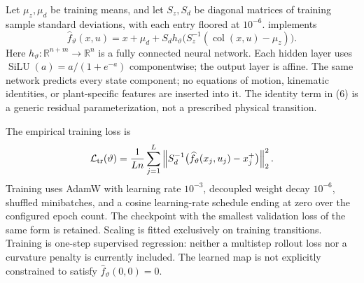 \documentclass[11pt]{article}
\newcommand{\col}{\operatorname{col}}
\newcommand{\code}[1]{\texttt{\detokenize{#1}}}
\begin{document}
Let $\mu_z,\mu_d$ be training means, and let $S_z,S_d$ be diagonal matrices of training sample standard deviations, with each entry floored at $10^{-6}$. \code{DataDrivenTransition} implements
\begin{equation}\label{eq:transition}
\widehat f_\vartheta(x,u)=x+\mu_d+S_d h_\vartheta\bigl(S_z^{-1}(\col(x,u)-\mu_z)\bigr).
\end{equation}
Here $h_\vartheta:\mathbb R^{n+m}\to\mathbb R^n$ is a fully connected neural network. Each hidden layer uses $\operatorname{SiLU}(a)=a/(1+e^{-a})$ componentwise; the output layer is affine. The same network predicts every state component; no equations of motion, kinematic identities, or plant-specific features are inserted into it. The identity term in (6) is a generic residual parameterization, not a prescribed physical transition.

The empirical training loss is
\begin{equation}\label{eq:loss}
\mathcal L_{\rm tr}(\vartheta)=\frac1{Ln}\sum_{j=1}^L\left\|S_d^{-1}\bigl(\widehat f_\vartheta(x_j,u_j)-x_j^+\bigr)\right\|_2^2.
\end{equation}
Training uses AdamW with learning rate $10^{-3}$, decoupled weight decay $10^{-6}$, shuffled minibatches, and a cosine learning-rate schedule ending at zero over the configured epoch count. The checkpoint with the smallest validation loss of the same form is retained. Scaling is fitted exclusively on training transitions. Training is one-step supervised regression: neither a multistep rollout loss nor a curvature penalty is currently included. The learned map is not explicitly constrained to satisfy $\widehat f_\vartheta(0,0)=0$.
\end{document}
